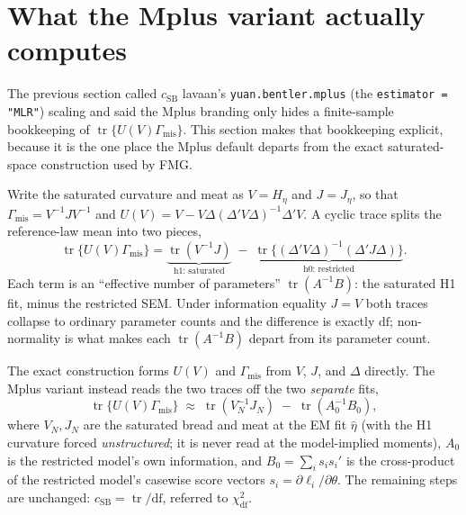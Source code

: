 \documentclass[11pt]{article}
\newcommand{\tr}{\operatorname{tr}}
\begin{document}
\section*{What the Mplus variant actually computes}

The previous section called \(c_{\mathrm{SB}}\) lavaan's
\texttt{yuan.bentler.mplus} (the \texttt{estimator = "MLR"}) scaling and said the
Mplus branding only hides a finite-sample bookkeeping of
\(\tr\{U(V)\Gamma_{\mathrm{mis}}\}\). This section makes that bookkeeping
explicit, because it is the one place the Mplus default departs from the exact
saturated-space construction used by FMG.

Write the saturated curvature and meat as \(V=H_\eta\) and \(J=J_\eta\), so that
\(\Gamma_{\mathrm{mis}}=V^{-1}JV^{-1}\) and
\(U(V)=V-V\Delta(\Delta'V\Delta)^{-1}\Delta'V\). A cyclic trace splits the
reference-law mean into two pieces,
\[
  \tr\{U(V)\Gamma_{\mathrm{mis}}\}
    =
  \underbrace{\tr(V^{-1}J)}_{\text{h1: saturated}}
  \;-\;
  \underbrace{\tr\{(\Delta'V\Delta)^{-1}(\Delta'J\Delta)\}}_{\text{h0: restricted}} .
\]
Each term is an ``effective number of parameters'' \(\tr(A^{-1}B)\): the
saturated H1 fit, minus the restricted SEM. Under information equality
\(J=V\) both traces collapse to ordinary parameter counts and the difference is
exactly \(\mathrm{df}\); non-normality is what makes each \(\tr(A^{-1}B)\) depart
from its parameter count.

The exact construction forms \(U(V)\) and \(\Gamma_{\mathrm{mis}}\) from \(V\),
\(J\), and \(\Delta\) directly. The Mplus variant instead reads the two traces
off the two \emph{separate} fits,
\[
  \tr\{U(V)\Gamma_{\mathrm{mis}}\}
  \;\approx\;
  \tr(V_N^{-1}J_N)
  \;-\;
  \tr(A_0^{-1}B_0),
\]
where \(V_N,J_N\) are the saturated bread and meat at the EM fit \(\hat\eta\)
(with the H1 curvature forced \emph{unstructured}; it is never read at the
model-implied moments), \(A_0\) is the restricted model's own information, and
\(B_0=\sum_i s_i s_i'\) is the cross-product of the restricted model's casewise
score vectors \(s_i=\partial\ell_i/\partial\theta\). The remaining steps are
unchanged: \(c_{\mathrm{SB}}=\tr/\mathrm{df}\), referred to \(\chi^2_{\mathrm{df}}\).
\end{document}
